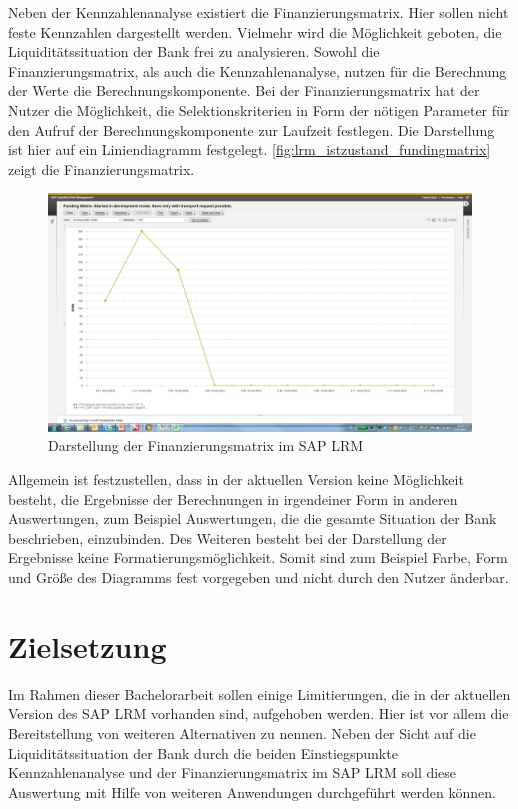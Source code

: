 \begin{onehalfspacing}
Neben der Kennzahlenanalyse existiert die Finanzierungsmatrix. Hier sollen nicht feste Kennzahlen dargestellt werden. Vielmehr wird  die Möglichkeit geboten, die Liquiditätssituation der Bank frei zu analysieren. Sowohl die Finanzierungsmatrix, als auch die Kennzahlenanalyse, nutzen für die Berechnung der Werte die Berechnungskomponente. Bei der Finanzierungsmatrix hat der Nutzer die Möglichkeit, die Selektionskriterien in Form der nötigen Parameter für den Aufruf der Berechnungskomponente zur Laufzeit festlegen. Die Darstellung ist hier auf ein Liniendiagramm festgelegt. \vref{fig:lrm_istzustand_fundingmatrix} zeigt die Finanzierungsmatrix.

\begin{figure}[h]
\centering
\setlength{\unitlength}{1mm}
\includegraphics[width=15cm]{images/Funding_Matrix_Example.png}
\caption{Darstellung der Finanzierungsmatrix im SAP LRM\label{fig:lrm_istzustand_fundingmatrix}}
\end{figure} 

Allgemein ist festzustellen, dass in der aktuellen Version keine Möglichkeit besteht, die Ergebnisse der Berechnungen in irgendeiner Form in anderen Auswertungen, zum Beispiel Auswertungen, die die gesamte Situation der Bank beschrieben, einzubinden. Des Weiteren besteht bei der Darstellung der Ergebnisse keine Formatierungsmöglichkeit. Somit sind zum Beispiel Farbe, Form und Größe des Diagramms fest vorgegeben und nicht durch den Nutzer änderbar.

\section{Zielsetzung}
\label{sec:zielsetzung}

Im Rahmen dieser Bachelorarbeit sollen einige Limitierungen, die in der aktuellen Version des SAP LRM vorhanden sind, aufgehoben werden. Hier ist vor allem die Bereitstellung von weiteren Alternativen zu nennen. Neben der Sicht auf die Liquiditätssituation der Bank durch die beiden Einstiegspunkte Kennzahlenanalyse und der Finanzierungsmatrix im SAP LRM soll diese Auswertung mit Hilfe von weiteren Anwendungen durchgeführt werden können.


\end{onehalfspacing}
